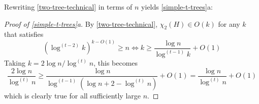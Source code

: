 \documentclass[kpfonts]{patmorin}
\newcommand{\trn}{\chi_2}
\theoremstyle{named}
\newcommand{\weirdref}[2]{\cref{#1}#2}
\begin{document}
Rewriting \cref{two-tree-technical} in terms of $n$ yields \weirdref{simple-t-trees}{a}:

\begin{proof}[Proof of \weirdref{simple-t-trees}{a}]
    By \cref{two-tree-technical}, $\trn(H)\in O(k)$ for any $k$ that satisfies
    \[  (\log^{(t-2)} k)^{k-O(1)} \ge n \Leftrightarrow
        k \ge \frac{\log n}{\log^{(t-1)} k} + O(1)
    \]
    Taking $k=2\log n/\log^{(t)} n$, this becomes
    \[
        \frac{2\log n}{\log^{(t)} n}
        \ge \frac{\log n}{\log^{(t-1)}(\log n + 2 -\log^{(t)} n)} + O(1)
        = \frac{\log n}{\log^{(t)} n} + O(1)
    \]
    which is clearly true for all sufficiently large $n$.
\end{proof}

%
%
%
%
%
\end{document}
